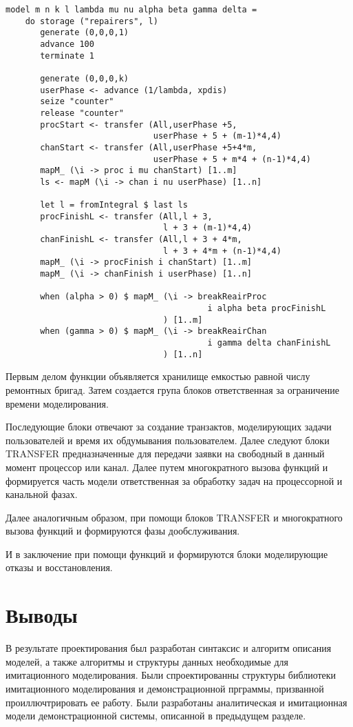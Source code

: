 \begin{verbatim}
model m n k l lambda mu nu alpha beta gamma delta = 
    do storage ("repairers", l)
       generate (0,0,0,1)
       advance 100
       terminate 1
       
       generate (0,0,0,k)
       userPhase <- advance (1/lambda, xpdis)
       seize "counter"
       release "counter"
       procStart <- transfer (All,userPhase +5, 
                              userPhase + 5 + (m-1)*4,4)
       chanStart <- transfer (All,userPhase +5+4*m, 
                              userPhase + 5 + m*4 + (n-1)*4,4)
       mapM_ (\i -> proc i mu chanStart) [1..m]
       ls <- mapM (\i -> chan i nu userPhase) [1..n]
       
       let l = fromIntegral $ last ls
       procFinishL <- transfer (All,l + 3,
                                l + 3 + (m-1)*4,4)
       chanFinishL <- transfer (All,l + 3 + 4*m,
                                l + 3 + 4*m + (n-1)*4,4)
       mapM_ (\i -> procFinish i chanStart) [1..m]
       mapM_ (\i -> chanFinish i userPhase) [1..n]
       
       when (alpha > 0) $ mapM_ (\i -> breakReairProc 
                                         i alpha beta procFinishL
                                ) [1..m]
       when (gamma > 0) $ mapM_ (\i -> breakReairChan 
                                         i gamma delta chanFinishL
                                ) [1..n]
\end{verbatim}

 Первым делом функции объявляется хранилище емкостью равной числу ремонтных бригад. Затем создается група блоков ответственная за ограничение времени моделирования.

Последующие блоки отвечают за создание транзактов, моделирующих задачи пользователей и время их обдумывания пользователем. Далее следуют блоки TRANSFER предназначенные для передачи заявки на свободный в данный момент процессор или канал. Далее путем многократного вызова функций  и  формируется часть модели ответственная за обработку задач на процессорной и канальной фазах. 

Далее аналогичным образом, при помощи блоков TRANSFER и многократного вызова функций  и  формируются фазы дообслуживания. 

И в заключение при помощи функций  и  формируются блоки моделирующие отказы и восстановления.

\section{Выводы}

В результате проектирования был разработан синтаксис и алгоритм описания моделей, а также алгоритмы и структуры данных необходимые для имитационного моделирования. Были спроектированны структуры библиотеки имитационного моделирования и демонстрационной прграммы, призванной проиллючтрировать ее работу. Были разработаны аналитическая и имитационная модели демонстрационной системы, описанной в предыдущем разделе.
